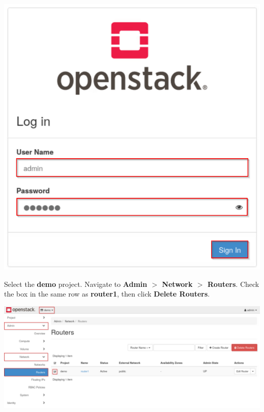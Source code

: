 \documentclass[letterpaper, 12pt]{article}
\begin{document}
\begin{enumerate}
\begin{labstep}
        \begin{center}
            \includegraphics[scale=0.5]{images/part1/step3.png}
        \end{center}
    \end{labstep}

    \begin{labstep}
        Select the \textbf{demo} project.
        Navigate to \textbf{Admin $>$ Network $>$ Routers}.
        Check the box in the same row as \textbf{router1}, then click \textbf{Delete Routers}.

        \begin{center}
            \includegraphics[width=\linewidth]{images/part1/step4.png}
        \end{center}
    \end{labstep}


\end{enumerate}
\end{document}

